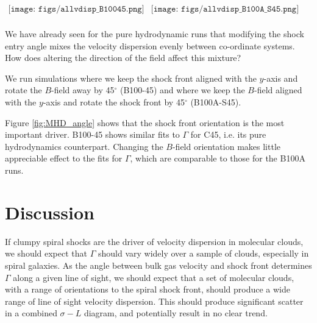 \documentclass[a4paper,fleqn,usenatbib]{mnras}
\begin{document}
\begin{figure*}
\begin{center}$
\begin{array}{cc}
\texttt{[image: figs/allvdisp\_B10045.png]} &
\texttt{[image: figs/allvdisp\_B100A\_S45.png]} \\
\end{array}$
\end{center}
\caption{The velocity dispersion as a function of size scale for the $x,y,z$ components as a function of shock angle.  Left: MHD run with shock arriving head on, and field oriented at 45$^\circ$ (B10045); right, MHD run with field parallel to the y-axis and the shock arriving at a 45$^\circ$ angle. All are measured at $t=0.5$ units.\label{fig:MHD_angle}}
\end{figure*}

\noindent We have already seen for the pure hydrodynamic runs that modifying the shock entry angle mixes the velocity dispersion evenly between co-ordinate systems.  How does altering the direction of the field affect this mixture?

We run simulations where we keep the shock front aligned with the $y$-axis and rotate the $B$-field away by 45$^\circ$ (B100-45) and where we keep the $B$-field aligned with the $y$-axis and rotate the shock front by 45$^\circ$ (B100A-S45).  

Figure \ref{fig:MHD_angle} shows that the shock front orientation is the most important driver.  B100-45 shows similar fits to $\Gamma$ for C45, i.e. its pure hydrodynamics counterpart.  Changing the $B$-field orientation makes little appreciable effect to the fits for $\Gamma$, which are comparable to those for the B100A runs.

\section{Discussion}
\label{sec:discussion}

\noindent If clumpy spiral shocks are the driver of velocity dispersion in molecular clouds, we should expect that $\Gamma$ should vary widely over a sample of clouds, especially in spiral galaxies.  As the angle between bulk gas velocity and shock front determines $\Gamma$ along a given line of sight, we should expect that a set of molecular clouds, with a range of orientations to the spiral shock front, should produce a wide range of line of sight velocity dispersion.  This should produce significant scatter in a combined $\sigma-L$ diagram, and potentially result in no clear trend.
\end{document}
